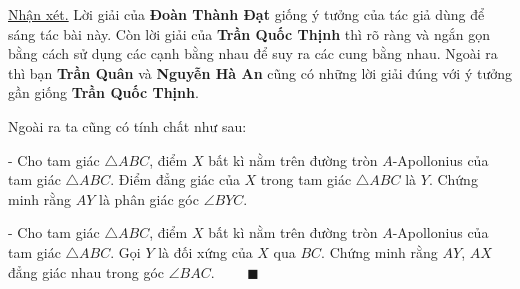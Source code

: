 \underline{Nhận xét.} Lời giải của \textbf{Đoàn Thành Đạt} giống ý tưởng của tác giả dùng để sáng tác bài này. Còn lời giải của \textbf{Trần Quốc Thịnh} thì rõ ràng và ngắn gọn bằng cách sử dụng các cạnh bằng nhau để suy ra các cung bằng nhau. Ngoài ra thì bạn \textbf{Trần Quân} và \textbf{Nguyễn Hà An} cũng có những lời giải đúng với ý tưởng gần giống \textbf{Trần Quốc Thịnh}.

Ngoài ra ta cũng có tính chất như sau:

- Cho tam giác $\triangle ABC$, điểm $X$ bất kì nằm trên đường tròn $A$-Apollonius của tam giác $\triangle ABC$. Điểm đẳng giác của $X$ trong tam giác $\triangle ABC$ là $Y$. Chứng minh rằng $AY$ là phân giác góc $\angle BYC$.

- Cho tam giác $\triangle ABC$, điểm $X$ bất kì nằm trên đường tròn $A$-Apollonius của tam giác $\triangle ABC$. Gọi $Y$ là đối xứng của $X$ qua $BC$. Chứng minh rằng $AY$, $AX$ đẳng giác nhau trong góc $\angle BAC$. $\qquad \blacksquare$